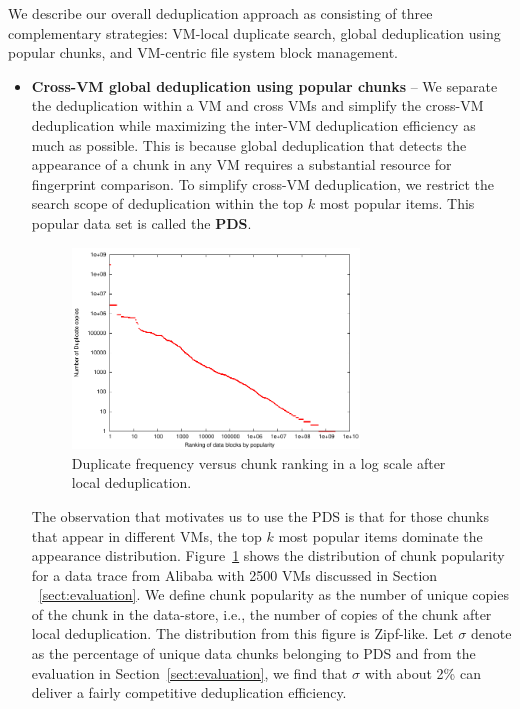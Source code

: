 We describe our overall deduplication approach as consisting of three
complementary strategies: VM-local
duplicate search, global deduplication using popular chunks, and 
VM-centric file system block management. 
\begin{itemize}
\item 
\textbf{Cross-VM global deduplication using popular chunks} --
We separate the deduplication within a VM and cross VMs
and simplify the cross-VM deduplication while maximizing the inter-VM deduplication efficiency  as much as possible.
This is because global deduplication that detects the appearance of a chunk 
in any VM requires a substantial resource for fingerprint comparison.
To simplify cross-VM deduplication, we restrict the search scope of deduplication within the top $k$ 
most popular items. This popular data set is called the \textbf{PDS}. 
 \begin{figure}
 \centering
  \includegraphics[width=3in]{figures/zipf_count_rank.pdf}
 \caption{Duplicate frequency versus  chunk ranking in a log scale after local deduplication.}
 \label{fig:Datazipf}
 \end{figure}


The observation that motivates us to use the PDS
is that for those chunks that appear in different VMs, the top $k$ most popular items
dominate the appearance distribution.  
Figure~\ref{fig:Datazipf} shows the distribution of chunk popularity for a data trace 
from Alibaba with 2500 VMs discussed in Section ~\ref{sect:evaluation}.
We define chunk popularity as the number of unique copies of the chunk in the data-store,
i.e., the number of copies of the chunk after local deduplication.
The distribution from this figure is Zipf-like. 
Let  $\sigma$ denote as the percentage of unique data chunks belonging to PDS and 
from the evaluation in Section~\ref{sect:evaluation}, we find that
$\sigma$ with about  2\% can deliver a fairly competitive deduplication efficiency.


\end{itemize}
